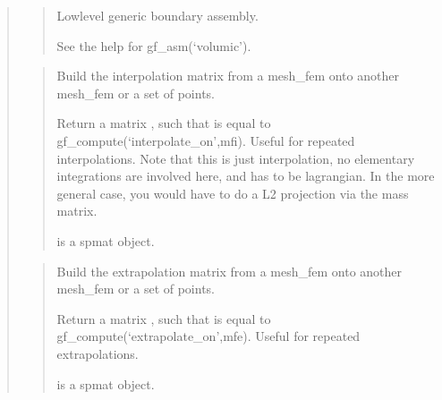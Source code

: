 \documentclass[a4paper,11pt,english]{sphinxmanual}
\begin{document}
\begin{quote}
\begin{quote}
\begin{sphinxVerbatim}[commandchars=\\\{\}]
 
\end{sphinxVerbatim}
\end{quote}

\begin{quote}

Low\sphinxhyphen{}level generic boundary assembly.

See the help for gf\_asm(‘volumic’).
\end{quote}

\begin{quote}

Build the interpolation matrix from a mesh\_fem onto another mesh\_fem or a set of points.

Return a matrix , such that  is equal to
gf\_compute(‘interpolate\_on’,mfi). Useful for repeated interpolations.
Note that this is just interpolation, no elementary integrations
are involved here, and  has to be lagrangian. In the more
general case, you would have to do a L2 projection via the mass
matrix.

 is a spmat object.
\end{quote}

\begin{quote}

Build the extrapolation matrix from a mesh\_fem onto another mesh\_fem or a set of points.

Return a matrix , such that  is equal to
gf\_compute(‘extrapolate\_on’,mfe). Useful for repeated
extrapolations.

 is a spmat object.
\end{quote}


\end{quote}
\end{document}
